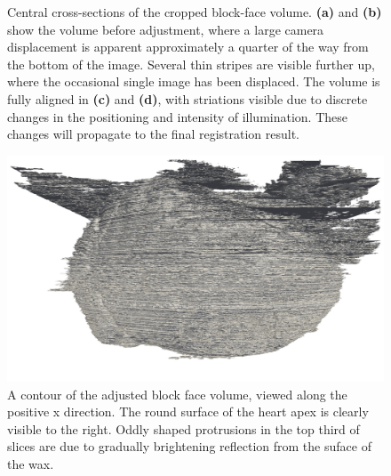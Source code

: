 \begin{figure}
      \caption{Central cross-sections of the cropped block-face volume. \textbf{(a)} and \textbf{(b)} show the volume before adjustment, where a large camera displacement is apparent approximately a quarter of the way from the bottom of the image. Several thin stripes are visible further up, where the occasional single image has been displaced. The volume is fully aligned in \textbf{(c)} and \textbf{(d)}, with striations visible due to discrete changes in the positioning and intensity of illumination. These changes will propagate to the final registration result.}
      \label{fig:LoRes_cross_sections}
    \end{figure}
    
    \begin{figure}
      \centering
      \includegraphics[width=\textheight]{Ch5/Figs/Rat28/contours/LoRes_positive_x}
      \caption{A contour of the adjusted block face volume, viewed along the positive x direction. The round surface of the heart apex is clearly visible to the right. Oddly shaped protrusions in the top third of slices are due to gradually brightening reflection from the suface of the wax.}
      \label{fig:LoRes_positive_x}
    \end{figure}
    
